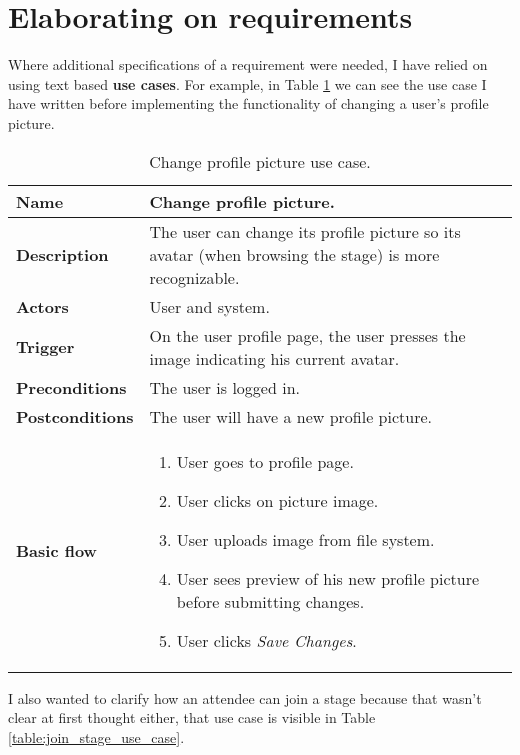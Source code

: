 \section{Elaborating on requirements}

Where additional specifications of a requirement were needed, I have relied on using text based \textbf{use cases}. For example, in Table \ref{table:change-profile-picture-use-case} we can see the use case I have written before implementing the functionality of changing a user's profile picture.

\begin{table}
	\centering

	\begin{tabular}{ | p{3.2cm} | p{11cm} | }
	 	\hline 
		\textbf{Name} & Change profile picture. \\
		\hline
		\textbf{Description} & The user can change its profile picture so its avatar (when browsing the stage) is more recognizable. \\
		\hline
		\textbf{Actors} & User and system. \\
		\hline
		\textbf{Trigger} & On the user profile page, the user presses the image indicating his current avatar. \\
		\hline
		\textbf{Preconditions} & The user is logged in. \\
		\hline
		\textbf{Postconditions} & The user will have a new profile picture. \\
		\hline
		\textbf{Basic flow} & \begin{enumerate}[topsep=1em,parsep=-.5em]
			\item User goes to profile page.
			\item User clicks on picture image.
			\item User uploads image from file system.
			\item User sees preview of his new profile picture before submitting changes.
			\item User clicks \textit{Save Changes}.
		\end{enumerate}} \\
		\hline
	\end{tabular}	

	\caption{Change profile picture use case.}
	\label{table:change-profile-picture-use-case}
\end{table}

I also wanted to clarify how an attendee can join a stage because that wasn't clear at first thought either, that use case is visible in Table \ref{table:join_stage_use_case}.

